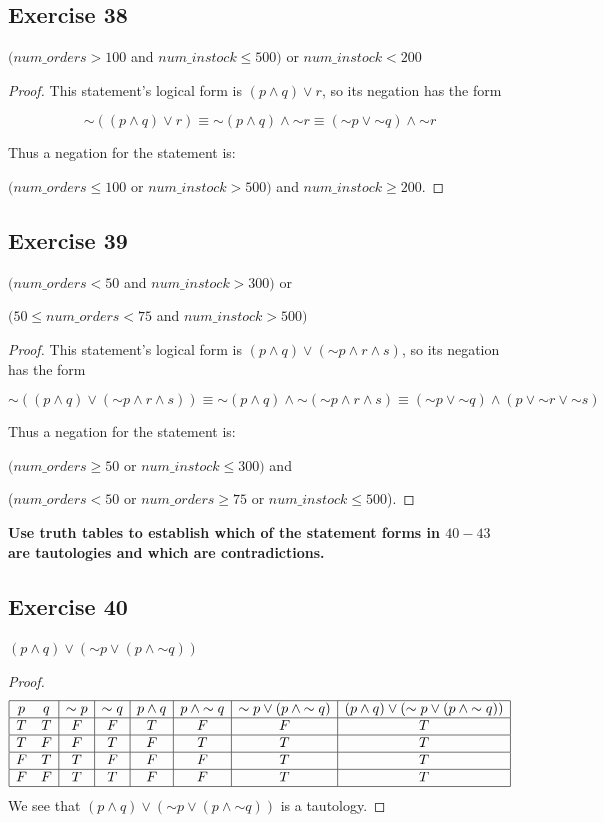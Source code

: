\documentclass[14pt]{extarticle}
\begin{document}
\subsection{Exercise 38}
$(num\_orders > 100$ and $num\_instock \leq 500)$ or $num\_instock < 200$

\begin{proof}
This statement’s logical form is $(p \wedge q) \vee r$, so its negation has the
form

$$
{\sim((p \wedge q) \vee r)} \equiv {\sim (p \wedge q)} \wedge {\sim r}
\equiv ({\sim p} \vee {\sim q}) \wedge {\sim r}
$$

Thus a negation for the statement is:

$(num\_orders \leq 100$ or $num\_instock > 500)$ and $num\_instock \geq 200$.
\end{proof}

\subsection{Exercise 39}
$(num\_orders < 50$ and $num\_instock > 300)$ or

$(50 \leq num\_orders < 75$ and $num\_instock > 500)$

\begin{proof}
This statement’s logical form is $(p \wedge q) \vee ({\sim p} \wedge r \wedge
s)$, so its negation has the form

$$
{\sim((p \wedge q) \vee ({\sim p} \wedge r \wedge s))} \equiv
{\sim(p \wedge q)} \wedge {\sim({\sim p} \wedge r \wedge s)} \equiv
({\sim p} \vee {\sim q}) \wedge (p \vee {\sim r} \vee {\sim s})
$$

Thus a negation for the statement is:

$(num\_orders \geq 50$ or $num\_instock \leq 300)$ and

($num\_orders < 50$ or $num\_orders \geq 75$ or $num\_instock \leq 500$).
\end{proof}

{\bf Use truth tables to establish which of the statement forms in $40-43$ are
tautologies and which are contradictions.}

\subsection{Exercise 40}
$(p \wedge q) \vee ({\sim p} \vee (p \wedge {\sim q}))$

\begin{proof}
$$
\begin{array}{|cc|c|c|c|c|c|c|}
\hline
p & q & {\sim p} & {\sim q} & p \wedge q & p \wedge {\sim q} &
{\sim p} \vee (p \wedge {\sim q}) &
(p \wedge q) \vee ({\sim p} \vee (p \wedge {\sim q})) \\
\hline
T & T & F & F & T & F & F & T \\
\hline
T & F & F & T & F & T & T & T \\
\hline
F & T & T & F & F & F & T & T \\
\hline
F & F & T & T & F & F & T & T \\
\hline
\end{array}
$$
We see that $(p \wedge q) \vee ({\sim p} \vee (p \wedge {\sim q}))$ is a
tautology.
\end{proof}
\end{document}
